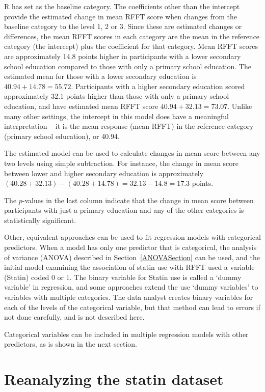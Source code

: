 \textsf{R} has set  as the baseline category. The coefficients other than the intercept provide the estimated change in mean RFFT score when  changes from the baseline category to the level 1, 2 or 3. Since these are estimated changes or differences, the mean RFFT scores in each category are the mean in the reference category (the intercept) plus the coefficient for that category. Mean RFFT scores are approximately 14.8 points higher in participants with a lower secondary school education compared to those with only a primary school education.  The estimated mean for those with a lower secondary education is $40.94 + 14.78 = 55.72$.  Participants with a higher secondary education scored approximately 32.1 points higher than those with only a primary school education, and have estimated mean RFFT score $40.94 + 32.13 = 73.07$.  Unlike many other settings, the intercept in this model does have a meaningful interpretation -- it is the mean response (mean RFFT) in the reference category (primary school education), or 40.94.

The estimated model can be used to calculate changes in mean score between any two levels using simple subtraction.  For instance, the change in mean score between lower and higher secondary education is approximately $(40.28 +32.13) - (40.28 +14.78) = 32.13 - 14.8 = 17.3$ points.

The $p$-values in the last column indicate that the change in mean score between participants with just a primary education and any of the other categories is statistically significant.

Other, equivalent approaches can be used to fit regression models with categorical predictors. When a model has only one predictor that is categorical, the analysis of variance (ANOVA) described in Section~\ref{ANOVASection} can be used, and the initial model examining the association of statin use with RFFT used a variable (Statin) coded 0 or 1. The binary variable for Statin use is called a `dummy variable' in regression, and some approaches extend the use `dummy variables' to variables with multiple categories.  The data analyst creates binary variables for each of the levels of the categorical variable, but that method can lead to errors if not done carefully, and is not described here.


Categorical variables can be included in multiple regression models with other predictors, as is shown in the next section.

\section{Reanalyzing the statin dataset}
\label{reanalyzingStatinDataSet}


